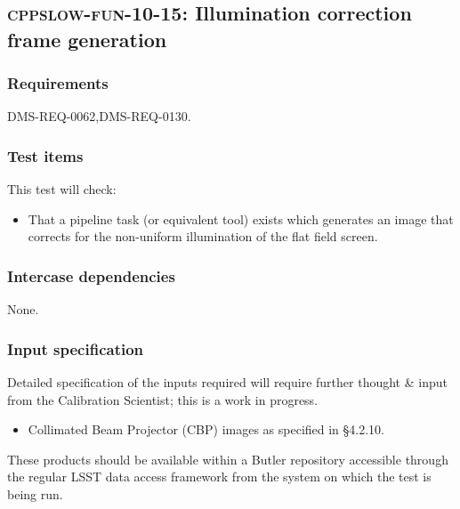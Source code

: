 \subsection{\textsc{cppslow-fun-10-15}: Illumination correction frame generation}
\label{cppslow-fun-10-15}

\subsubsection{Requirements}

DMS-REQ-0062,DMS-REQ-0130.

\subsubsection{Test items}

This test will check:

\begin{itemize}

  \item{That a pipeline task (or equivalent tool) exists which generates an
  image that corrects for the non-uniform illumination of the flat field
  screen.}

\end{itemize}

\subsubsection{Intercase dependencies}

None.

\subsubsection{Input specification}

\begin{note}
Detailed specification of the inputs required will require further thought \&
input from the Calibration Scientist; this is a work in progress.
\end{note}

\begin{itemize}

  \item{Collimated Beam Projector (CBP) images as specified in 
  \S4.2.10.}

\end{itemize}

These products should be available within a Butler repository accessible
through the regular LSST data access framework from the system on which the test
is being run.

